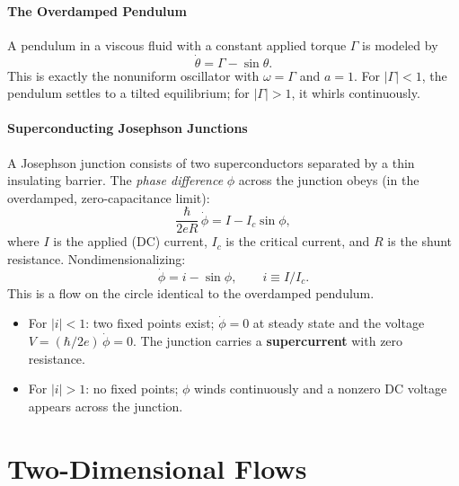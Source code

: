 \documentclass[11pt,letterpaper]{article}
\theoremstyle{definition}
\theoremstyle{plain}
\theoremstyle{remark}
\newcommand{\thetadot}{\dot{\theta}}
\begin{document}
\subsection{The Overdamped Pendulum}

A pendulum in a viscous fluid with a constant applied torque $\Gamma$ is
modeled by
\begin{equation}
  \thetadot = \Gamma - \sin\theta.
\end{equation}
This is exactly the nonuniform oscillator with $\omega = \Gamma$ and $a=1$.
For $|\Gamma|<1$, the pendulum settles to a tilted equilibrium; for
$|\Gamma|>1$, it whirls continuously.

\subsection{Superconducting Josephson Junctions}\label{sec:josephson-1d}

A Josephson junction consists of two superconductors separated by a thin
insulating barrier.  The \emph{phase difference} $\phi$ across the junction
obeys (in the overdamped, zero-capacitance limit):
\begin{equation}\label{eq:JJ-1D}
  \frac{\hbar}{2eR}\,\dot{\phi} = I - I_c \sin\phi,
\end{equation}
where $I$ is the applied (DC) current, $I_c$ is the critical current, and
$R$ is the shunt resistance.  Nondimensionalizing:
\begin{equation}
  \dot{\phi} = i - \sin\phi, \qquad i \equiv I/I_c.
\end{equation}
This is a flow on the circle identical to the overdamped pendulum.
\begin{itemize}[leftmargin=2em]
\item For $|i|<1$: two fixed points exist; $\dot{\phi}=0$ at steady state
      and the voltage $V = (\hbar/2e)\,\dot{\phi} = 0$.  The junction
      carries a \textbf{supercurrent} with zero resistance.
\item For $|i|>1$: no fixed points; $\phi$ winds continuously and a
      nonzero DC voltage appears across the junction.
\end{itemize}

\part{Two-Dimensional Flows}
\end{document}

